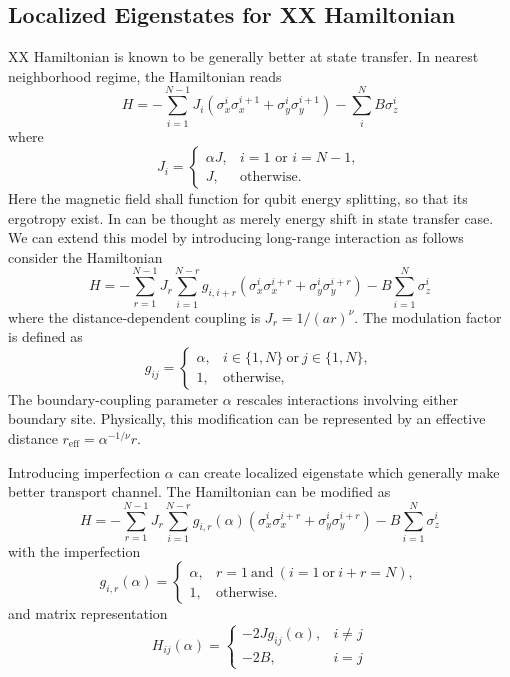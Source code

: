 \documentclass[../../../main.tex]{subfiles}
\begin{document}
\subsection{Localized Eigenstates for XX Hamiltonian}
XX Hamiltonian is known to be generally better at state transfer.
In nearest neighborhood regime, the Hamiltonian reads
\begin{equation*}
  H=-\sum_{i=1}^{N-1}J_i\left(\sigma_x^i\sigma_x^{i+1}+\sigma_y^i\sigma_y^{i+1}\right)
  - \sum_{i } ^N B \sigma_{z}^i
\end{equation*}
where
\begin{equation*}
  J_i=
  \begin{cases}
    \alpha J, & i=1 \text{ or } i=N-1, \\
    J,        & \text{otherwise}.
  \end{cases}
\end{equation*}
Here the magnetic field shall function for qubit energy splitting, so that its ergotropy exist.
In can be thought as merely energy shift in state transfer case.
We can extend this model by introducing long-range interaction as follows
consider the Hamiltonian
\begin{equation*}
  H=-\sum_{r=1}^{N-1}J_r\sum_{i=1}^{N-r}g_{i,i+r}\left(\sigma_x^i\sigma_x^{i+r}+\sigma_y^i\sigma_y^{i+r}\right)
  -B\sum_{i=1}^{N}\sigma_z^i
\end{equation*}
where the distance-dependent coupling is $J_r=1/(ar)^\nu$.
The modulation factor is defined as
\begin{equation*}
  g_{ij} =
  \begin{cases}
    \alpha, & i\in\{1,N\}\ \text{or}\ j\in\{1,N\}, \\
    1,      & \text{otherwise},
  \end{cases}
\end{equation*}
The boundary-coupling parameter \(\alpha\) rescales interactions involving either boundary site.
Physically, this modification can be represented by an effective distance \(r_{\mathrm{eff}}=\alpha^{-1/\nu}r\).

Introducing imperfection $\alpha$ can create localized eigenstate which generally make better transport channel.
The Hamiltonian can be modified as
\begin{equation*}
  H= -\sum_{r=1}^{N-1}J_r \sum_{i=1}^{N-r} g_{i,r}(\alpha) \left( \sigma_x^i\sigma_x^{i+r} + \sigma_y^i\sigma_y^{i+r} \right) -B\sum_{i=1}^{N}\sigma_z^i
\end{equation*}
with the imperfection
\begin{equation*}
  g_{i,r}(\alpha)= \begin{cases} \alpha, & r=1 \ \text{and}\ \left(i=1\ \text{or}\ i+r=N\right), \\[2mm] 1, &\text{otherwise}. \end{cases}
\end{equation*}
and matrix representation
\begin{equation*}
  H_{ij}(\alpha)=
  \begin{cases}
    -2Jg_{ij}(\alpha), & i \neq j \\
    -2B,               & i=j
  \end{cases}
\end{equation*}
\end{document}
